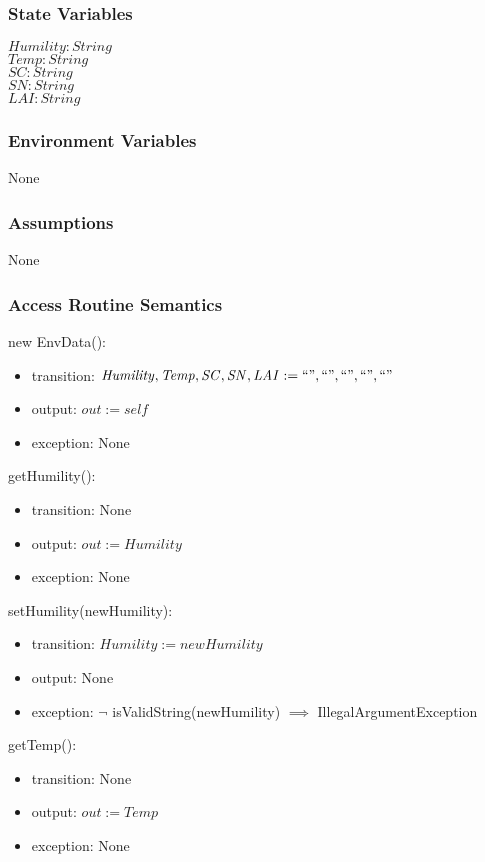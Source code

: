 \documentclass[12pt, titlepage]{article}
\begin{document}
\subsubsection{State Variables}
$\mathit{Humility: String}$\\
$\mathit{Temp: String}$\\
$\mathit{SC: String}$\\
$\mathit{SN: String}$\\
$\mathit{LAI: String}$\\

\subsubsection{Environment Variables}
None

\subsubsection{Assumptions}
None

\subsubsection{Access Routine Semantics}

\noindent new EnvData():
\begin{itemize}
\item transition: $\mathit{Humility, Temp, SC, SN, LAI := ``", ``", ``", ``", ``"}$
\item output: $\mathit{out := self}$
\item exception: None 
\end{itemize}


\newcommand{\attr}{Humility}
\noindent get\attr():
\begin{itemize}
\item transition: None
\item output: $\mathit{out := \attr}$
\item exception: None
\end{itemize}

\noindent set\attr(new\attr):
\begin{itemize}
\item transition: $\mathit{\attr := new\attr}$
\item output: None
\item exception: $\neg$ isValidString(new\attr) $\implies$
IllegalArgumentException
\end{itemize}


\renewcommand{\attr}{Temp}
\noindent get\attr():
\begin{itemize}
\item transition: None
\item output: $\mathit{out := \attr}$
\item exception: None
\end{itemize}
\end{document}
